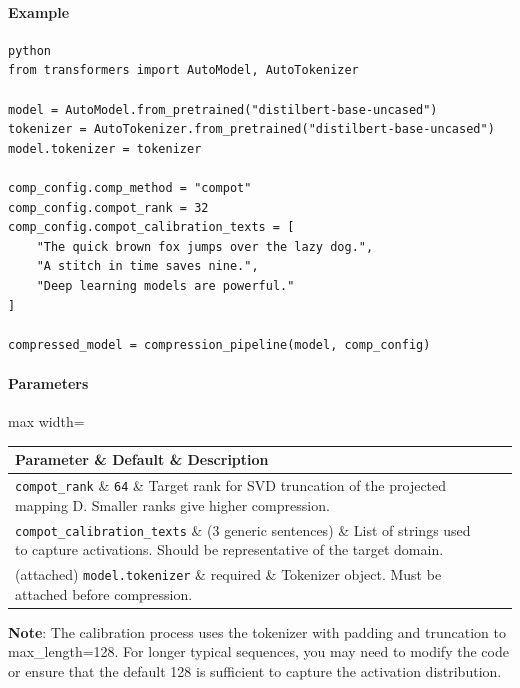 \paragraph{Example}

\vspace{0.5em}
\begin{mdframed}[backgroundcolor=codebg, linecolor=codeframe, linewidth=1pt, roundcorner=4pt, innerleftmargin=2pt, innerrightmargin=5pt, innertopmargin=5pt, innerbottommargin=5pt]
\begin{lstlisting}
python
from transformers import AutoModel, AutoTokenizer

model = AutoModel.from_pretrained("distilbert-base-uncased")
tokenizer = AutoTokenizer.from_pretrained("distilbert-base-uncased")
model.tokenizer = tokenizer

comp_config.comp_method = "compot"
comp_config.compot_rank = 32
comp_config.compot_calibration_texts = [
    "The quick brown fox jumps over the lazy dog.",
    "A stitch in time saves nine.",
    "Deep learning models are powerful."
]

compressed_model = compression_pipeline(model, comp_config)
\end{lstlisting}
\end{mdframed}
\vspace{0.5em}

\paragraph{Parameters}

\begin{center}
\begin{adjustbox}{max width=\columnwidth}
\renewcommand{\arraystretch}{1.2}
\begin{tabular}{lll}
\toprule
Parameter \& Default \& Description \\
\midrule
\texttt{compot\_rank} \& \texttt{64} \& Target rank for SVD truncation of the projected mapping D. Smaller ranks give higher compression. \\
\texttt{compot\_calibration\_texts} \& (3 generic sentences) \& List of strings used to capture activations. Should be representative of the target domain. \\
(attached) \texttt{model.tokenizer} \& required \& Tokenizer object. Must be attached before compression. \\

\bottomrule
\end{tabular}
\end{adjustbox}
\end{center}
\textbf{Note}: The calibration process uses the tokenizer with padding and truncation to max\_length=128. For longer typical sequences, you may need to modify the code or ensure that the default 128 is sufficient to capture the activation distribution.


